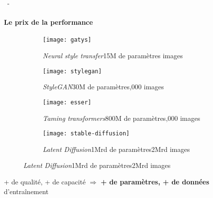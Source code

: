 \documentclass[aspectratio=169, 22pt]{beamer}
\begin{document}
\begin{frame}{\secname~- \subsecname}
  \framesubtitle{Le prix de la performance}
  \begin{figure}
    \begin{subfigure}[t]{0.24\linewidth}\centering
      \texttt{[image: gatys]}
      \caption{{\emph{Neural style transfer}\newline[Gatys et al., 2016]\newline 15M de paramètres images}}
    \end{subfigure}
    \begin{subfigure}[t]{0.24\linewidth}\centering
      \texttt{[image: stylegan]}                
      \caption{{\emph{StyleGAN}\newline[Karras et al., 2019]\newline 30M de paramètres,000 images}}
    \end{subfigure}
    \begin{subfigure}[t]{0.24\linewidth}\centering
      \texttt{[image: esser]}                      
      \caption{\emph{Taming transformers}\newline[Esser et al., 2021]\newline 800M de paramètres,000 images}
    \end{subfigure}
    \begin{subfigure}[t]{0.24\linewidth}\centering
      \texttt{[image: stable-diffusion]}
      \caption{\emph{Latent Diffusion}\newline[Rombach et al., 2022]\newline 1Mrd de paramètres\newline 2Mrd images}
    \end{subfigure}
  \end{figure}
  \begin{exampleblock}{}
    \centering
    + de qualité, + de capacité $\Rightarrow$ \textbf{+ de \alert{paramètres}, + de \alert{données}}  d'entraînement
  \end{exampleblock}
\end{frame}
\end{document}
